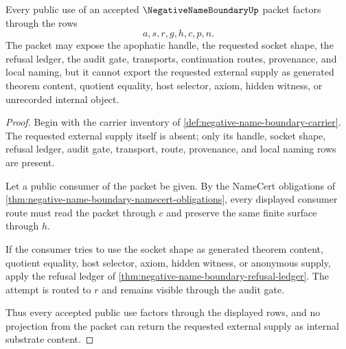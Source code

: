 \begin{theorem}
\label{thm:negative-name-boundary-non-internalization}
Every public use of an accepted $\NegativeNameBoundaryUp$ packet factors through the rows
$$
a,s,r,g,h,c,p,n.
$$
The packet may expose the apophatic handle, the requested socket shape, the refusal ledger, the audit gate, transports, continuation routes, provenance, and local naming, but it cannot export the requested external supply as generated theorem content, quotient equality, host selector, axiom, hidden witness, or unrecorded internal object.
\end{theorem}
\begin{proof}
Begin with the carrier inventory of \autoref{def:negative-name-boundary-carrier}. The requested external supply itself is absent; only its handle, socket shape, refusal ledger, audit gate, transport, route, provenance, and local naming rows are present.

Let a public consumer of the packet be given. By the NameCert obligations of \autoref{thm:negative-name-boundary-namecert-obligations}, every displayed consumer route must read the packet through $c$ and preserve the same finite surface through $h$.

If the consumer tries to use the socket shape as generated theorem content, quotient equality, host selector, axiom, hidden witness, or anonymous supply, apply the refusal ledger of \autoref{thm:negative-name-boundary-refusal-ledger}. The attempt is routed to $r$ and remains visible through the audit gate.

Thus every accepted public use factors through the displayed rows, and no projection from the packet can return the requested external supply as internal substrate content.
\end{proof}


